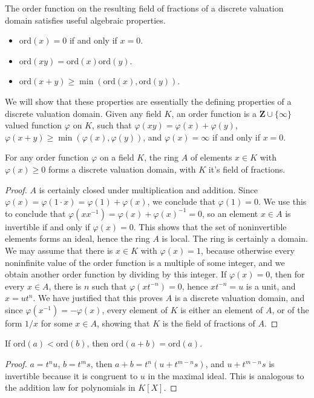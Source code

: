 The order function on the resulting field of fractions of a discrete valuation domain satisfies useful algebraic properties.
%
\begin{itemize}
    \item $\text{ord}(x) = 0$ if and only if $x = 0$.
    \item $\text{ord}(xy) = \text{ord}(x) \text{ord}(y)$.
    \item $\text{ord}(x + y) \geq \min(\text{ord}(x), \text{ord}(y))$.
\end{itemize}
%
We will show that these properties are essentially the defining properties of a discrete valuation domain. Given any field $K$, an order function is a $\mathbf{Z} \cup \{ \infty \}$ valued function $\varphi$ on $K$, such that $\varphi(xy) = \varphi(x) + \varphi(y)$, $\varphi(x + y) \geq \min(\varphi(x), \varphi(y))$, and $\varphi(x) = \infty$ if and only if $x = 0$.

\begin{prop}
    For any order function $\varphi$ on a field $K$, the ring $A$ of elements $x \in K$ with $\varphi(x) \geq 0$ forms a discrete valuation domain, with $K$ it's field of fractions.
\end{prop}
\begin{proof}
    $A$ is certainly closed under multiplication and addition. Since $\varphi(x) = \varphi(1 \cdot x) = \varphi(1) + \varphi(x)$, we conclude that $\varphi(1) = 0$. We use this to conclude that $\varphi(xx^{-1}) = \varphi(x) + \varphi(x)^{-1} = 0$, so an element $x \in A$ is invertible if and only if $\varphi(x) = 0$. This shows that the set of noninvertible elements forms an ideal, hence the ring $A$ is local. The ring is certainly a domain. We may assume that there is $x \in K$ with $\varphi(x) = 1$, because otherwise every noninfinite value of the order function is a multiple of some integer, and we obtain another order function by dividing by this integer. If $\varphi(x) = 0$, then for every $x \in A$, there is $n$ such that $\varphi(xt^{-n}) = 0$, hence $xt^{-n} = u$ is a unit, and $x = ut^n$. We have justified that this proves $A$ is a discrete valuation domain, and since $\varphi(x^{-1}) = -\varphi(x)$, every element of $K$ is either an element of $A$, or of the form $1/x$ for some $x \in A$, showing that $K$ is the field of fractions of $A$.
\end{proof}

\begin{prop}
    If $\text{ord}(a) < \text{ord}(b)$, then $\text{ord}(a + b) = \text{ord}(a)$.
\end{prop}
\begin{proof}
    $a = t^nu$, $b = t^ms$, then $a + b = t^n(u + t^{m-n}s)$, and $u + t^{m-n}s$ is invertible because it is congruent to $u$ in the maximal ideal. This is analogous to the addition law for polynomials in $K[X]$.
\end{proof}

